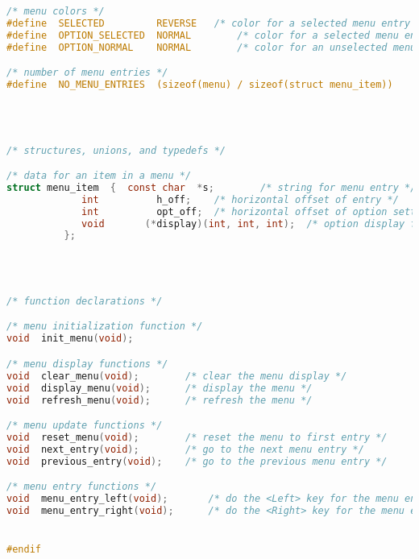 \begin{lstlisting}[language=C]
/* menu colors */
#define  SELECTED         REVERSE	/* color for a selected menu entry */
#define  OPTION_SELECTED  NORMAL        /* color for a selected menu entry option */
#define  OPTION_NORMAL    NORMAL        /* color for an unselected menu entry option */

/* number of menu entries */
#define  NO_MENU_ENTRIES  (sizeof(menu) / sizeof(struct menu_item))




/* structures, unions, and typedefs */

/* data for an item in a menu */
struct menu_item  {  const char  *s;		/* string for menu entry */
		     int          h_off;	/* horizontal offset of entry */
		     int          opt_off;	/* horizontal offset of option setting */
		     void       (*display)(int, int, int);	/* option display function */
		  };




/* function declarations */

/* menu initialization function */
void  init_menu(void);

/* menu display functions */
void  clear_menu(void);		   /* clear the menu display */
void  display_menu(void);	   /* display the menu */
void  refresh_menu(void);	   /* refresh the menu */

/* menu update functions */
void  reset_menu(void);		   /* reset the menu to first entry */
void  next_entry(void);		   /* go to the next menu entry */
void  previous_entry(void);	   /* go to the previous menu entry */

/* menu entry functions */
void  menu_entry_left(void);	   /* do the <Left> key for the menu entry */
void  menu_entry_right(void);	   /* do the <Right> key for the menu entry */


#endif
\end{lstlisting}

